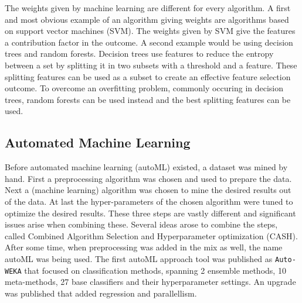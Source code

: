 	The weights given by machine learning are different for every algorithm. A first and most obvious example of an algorithm giving weights are algorithms based on support vector machines (SVM). The weights given by SVM give the features a contribution factor in the outcome\cite{jong2004feature, prados2004mining, zhang2006recursive, guyon2002gene}. A second example would be using decision trees and random forests. Decision trees use features to reduce the entropy between a set by splitting it in two subsets with a threshold and a feature. These splitting features can be used as a subset to create an effective feature selection outcome\cite{geurts2005proteomic, wu2003comparison, Duch2006}. To overcome an overfitting problem, commonly occuring in decision trees, random forests can be used instead and the best splitting features can be used\cite{liaw2002classification}.

	
	
	
	
	
	\subsection{Automated Machine Learning}
	\label{subsec:AutomatedMachineLearning}
	
	Before automated machine learning (autoML) existed, a dataset was mined by hand. First a preprocessing algorithm was chosen and used to prepare the data. Next a (machine learning) algorithm was chosen to mine the desired results out of the data. At last the hyper-parameters of the chosen algorithm were tuned to optimize the desired results. These three steps are vastly different and significant issues arise when combining these. Several ideas arose to combine the steps, called Combined Algorithm Selection and Hyperparameter optimization (CASH)\cite{thornton2013auto}. After some time, when preprocessing was added in the mix as well, the name autoML was being used\cite{Gijsbers2017Thesis}. The first autoML approach tool was published as \texttt{Auto-WEKA} that focused on classification methods, spanning 2 ensemble methods, 10 meta-methods, 27 base classifiers and their hyperparameter settings\cite{thornton2013auto}. An upgrade was published that added regression and parallellism\cite{kotthoff2016auto}.   
	
